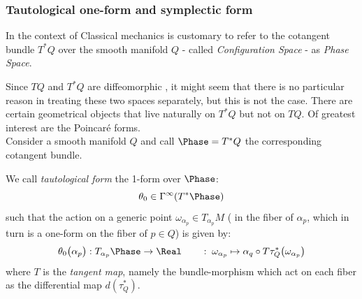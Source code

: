\documentclass[Main]{subfiles}
\begin{document}
			
			\subsubsection{Tautological one-form and symplectic form}
					\begin{remark}
						In the context of Classical mechanics is customary to refer to the cotangent bundle $T^*Q$ over the smooth manifold  $Q $ - called \emph{Configuration Space}  - as \emph{Phase Space}.
					\end{remark}

					Since $TQ$ and $T^*Q$ are diffeomorphic , it might seem that there is no particular reason in treating these two spaces separately, but this is not the case.
					There are certain geometrical objects that live naturally on $T^*Q$  but not on $TQ$.
					Of greatest interest %
					are the Poincaré forms\cite{Frankel2003}.\\
					Consider a smooth manifold $Q$ and call $\Phase=T^*Q$ the corresponding cotangent bundle.
					\begin{definition}
						We call \emph{tautological form} the 1-form over $\Phase$:
						\begin{displaymath}
							\theta_0 \in \Gamma^\infty (T^*\Phase)
						\end{displaymath}
					such that the action on a generic point $ \omega_{\alpha_p} \in T_{\alpha_p}M$ ( in the fiber of $\alpha_p$, which in turn is a one-form on the fiber of $p\in Q$) is given by:
						\begin{displaymath}
						\theta_0 \big(\alpha_p \big): T_{\alpha_p}\Phase \rightarrow \Real \qquad : \; \omega_{\alpha_p} \mapsto \alpha_q \circ T \tau^*_Q \big( \omega_{\alpha_p} \big)
						\end{displaymath}
					where $T$ is the \emph{tangent map}, namely the bundle-morphism which act on each fiber as the differential map $d (\tau^*_Q)$.
					\end{definition}
\end{document}
